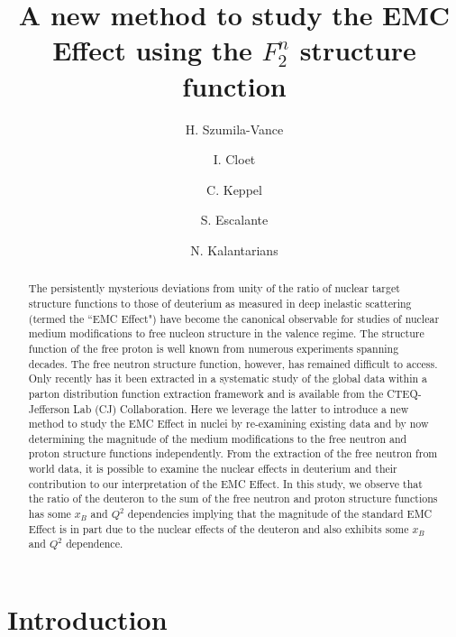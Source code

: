\documentclass[oneside]{article}
\title{\vspace{-15mm}\fontsize{20pt}{10pt}\selectfont\textbf{A new method to study the EMC Effect using the $F_2^{n}$ structure function}} %
\author[1]{H. Szumila-Vance}
\author[2]{I. Cloet}
\author[1]{C. Keppel}
\author[3]{S. Escalante}
\author[3]{N. Kalantarians}
\affil[1]{Thomas Jefferson National Accelerator Facility, Newport News, VA}
\affil[2]{Argonne National Laboratory, Argonne, IL}
\affil[3]{Virginia Union University, Richmond, VA}
\date{}
\begin{document}
\maketitle %

\thispagestyle{fancy} %


\begin{abstract}
The persistently mysterious deviations from unity of the ratio of nuclear target structure functions to those of deuterium as measured in deep inelastic scattering (termed the ``EMC Effect") have become the canonical observable for studies of nuclear medium modifications to free nucleon structure in the valence regime. The structure function of the free proton is well known from numerous experiments spanning decades. The free neutron structure function, however, has remained difficult to access. Only recently has it been extracted in a systematic study of the global data within a parton distribution function extraction framework and is available from the CTEQ-Jefferson Lab (CJ) Collaboration. Here we leverage the latter to introduce a new method to study the EMC Effect in nuclei by re-examining existing data and by now determining the magnitude of the medium modifications to the free neutron and proton structure functions independently. From the extraction of the free neutron from world data, it is possible to examine the nuclear effects in deuterium and their contribution to our interpretation of the EMC Effect. In this study, we observe that the ratio of the deuteron to the sum of the free neutron and proton structure functions has some $x_{B}$ and $Q^{2}$ dependencies implying that the magnitude of the standard EMC Effect is in part due to the nuclear effects of the deuteron and also exhibits some $x_{B}$ and $Q^{2}$ dependence.
\end{abstract}


\section{Introduction}
\end{document}
